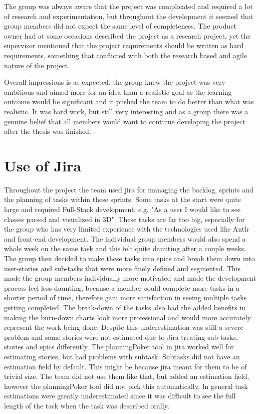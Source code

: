 The group was always aware that the project was complicated and required a lot of research and experimentation, but throughout the development it seemed that group members did not expect the same level of completeness. The product owner had at some occasions described the project as a research project, yet the supervisor mentioned that the project requirements should be written as hard requirements, something that conflicted with both the research based and agile nature of the project.

Overall impressions is as expected, the group knew the project was very ambitious and aimed more for an idea than a realistic goal as the learning outcome would be significant and it pushed the team to do better than what was realistic. It was hard work, but still very interesting and as a group there was a genuine belief that all members would want to continue developing the project after the thesis was finished.

\section{Use of Jira}
Throughout the project the team used \gls{jira} for managing the backlog, sprints and the planning of tasks within these sprints. Some tasks at the start were quite large and required Full-Stack development, e.g. "As a user I would like to see classes parsed and visualized in 3D". These tasks are far too big, especially for the group who has very limited experience with the technologies used like Antlr and front-end development. The individual group members would also spend a whole week on the same task and this felt quite daunting after a couple weeks. The group then decided to make these tasks into epics and break them down into user-stories and sub-tasks that were more finely defined and segmented. This made the group members individually more motivated and made the development process feel less daunting, because a member could complete more tasks in a shorter period of time, therefore gain more satisfaction in seeing multiple tasks getting completed. The break-down of the tasks also had the added benefits in making the burn-down charts look more professional and would more accurately represent the work being done. Despite this underestimation was still a severe problem and some stories were not estimated due to Jira treating sub-tasks, stories and epics differently. The \gls{planningPoker} tool in \gls{jira} worked well for estimating stories, but had problems with subtask. Subtasks did not have an estimation field by default. This might be because \gls{jira} meant for them to be of trivial size. The team did not use them like that, but added an estimation field, however the \gls{planningPoker} tool did not pick this automatically. In general task estimations were greatly underestimated since it was difficult to see the full length of the task when the task was described orally.

